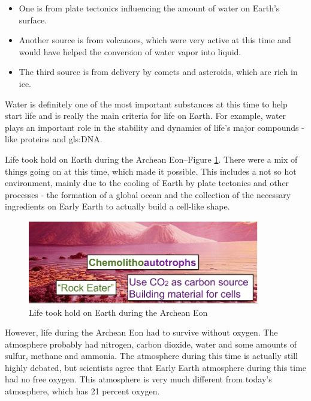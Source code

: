 \documentclass[]{article}
\begin{document}
\begin{itemize}
	\item One is from plate tectonics influencing the amount of water on Earth's surface.

	\item Another source is from volcanoes, which were very active at this time
	and would have helped the conversion of water vapor into liquid.

	\item The third source is from delivery by comets and asteroids,
	which are rich in ice.

\end{itemize}

Water is definitely one of the most
important substances
at this time to help start life
and is really the main criteria
for life on Earth.
For example,
water plays an important role
in the stability and dynamics
of life's major compounds -
like proteins and \gls{gls:DNA}.

Life took hold on Earth during the Archean Eon--Figure \ref{fig:Chemolithoautotrophs}. There were a mix of things going on
at this time,
which made it possible.
This includes a not so hot environment,
mainly due to the cooling of Earth
by plate tectonics and other processes -
the formation of a global ocean
and the collection of the necessary
ingredients on Early Earth
to actually build a cell-like shape.
\begin{figure}[H]
	\caption{Life took hold on Earth during the Archean Eon} \label{fig:Chemolithoautotrophs}
	\includegraphics[width=0.9\textwidth]{Chemolithoautotrophs}
\end{figure}

However, life during the Archean Eon
had to survive without oxygen.
The atmosphere probably had nitrogen,
carbon dioxide, water
and some amounts of sulfur,
methane and ammonia.
The atmosphere during this time
is actually still highly debated,
but scientists agree
that Early Earth atmosphere
during this time had no free oxygen.
This atmosphere is very much different
from today's atmosphere,
which has 21 percent oxygen.
\end{document}
